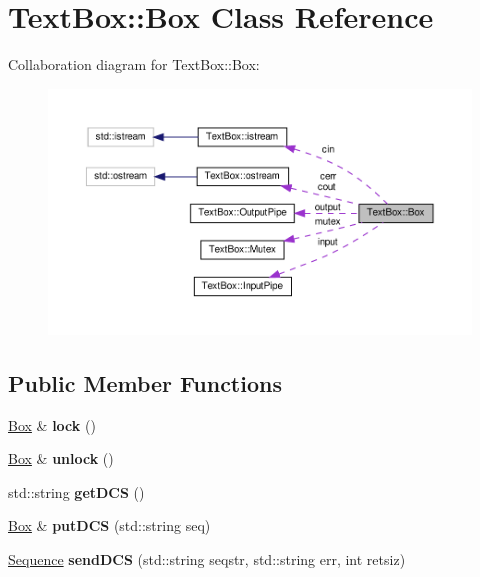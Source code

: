 \hypertarget{a00032}{}\section{Text\+Box\+:\+:Box Class Reference}
\label{a00032}


Collaboration diagram for Text\+Box\+:\+:Box\+:\nopagebreak
\begin{figure}[H]
\begin{center}
\leavevmode
\includegraphics[width=350pt]{a00030}
\end{center}
\end{figure}
\subsection*{Public Member Functions}
\begin{DoxyCompactItemize}
\item 
\mbox{\label{a00032_ad1ff097a7299048f3efbca46f6c8844d}} 
\hyperlink{a00032}{Box} \& {\bfseries lock} ()
\item 
\mbox{\label{a00032_a4f79c74df9a31294b05f92a131fdddd0}} 
\hyperlink{a00032}{Box} \& {\bfseries unlock} ()
\item 
\mbox{\label{a00032_a9d5caf4fb5c26fbed60a4686bb81d291}} 
std\+::string {\bfseries get\+D\+CS} ()
\item 
\mbox{\label{a00032_a9033777e3b7f666c61a96412e7312af4}} 
\hyperlink{a00032}{Box} \& {\bfseries put\+D\+CS} (std\+::string seq)
\item 
\mbox{\label{a00032_a6c56ae4253031c1ed9a5f6ca558769b0}} 
\hyperlink{a00020}{Sequence} {\bfseries send\+D\+CS} (std\+::string seqstr, std\+::string err, int retsiz)
\end{DoxyCompactItemize}
